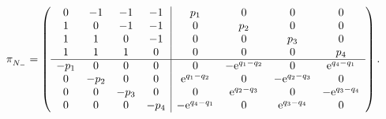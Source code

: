 \documentclass[12pt]{article}
\begin{document}
\begin{equation}
\label{piN-Toda}
\pi_{N_-}^{\phantom{\sharp}}
=\left( \begin {array}{cccc|cccc} 
0&-1&-1&-1&p_{{1}}&0&0&0\\ 
1&0&-1&-1&0&p_{{2}}&0&0\\ 
1&1&0&-1&0&0&p_{{3}}&0\\ 
1&1&1&0&0&0&0&p_{{4}}\\ 
\hline
-p_{{1}}&0&0&0&0&-{{\rm e}^{q_{{1}}-q_{{2}}}}&0&{{\rm e}^{q_{{4}}-q_{{1}}}}\\ 
0&-p_{{2}}&0&0&{{\rm e}^{q_{{1}}-q_{{2}}}}&0&-{{\rm e}^{q_{{2}}-q_{{3}}}}&0\\ 
0&0&-p_{{3}}&0&0&{{\rm e}^{q_{{2}}-q_{{3}}}}&0&-{{\rm e}^{q_{{3}}-q_{{4}}}}\\ 
0&0&0&-p_{{4}}&-{{\rm e}^{q_{{4}}-q_{{1}}}}&0&{{\rm e}^{q_{{3}}-q_{{4}}}}&0
\end {array} \right).
\end{equation}
\end{document}
